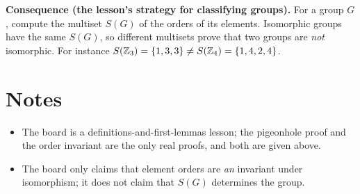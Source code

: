 \documentclass[11pt]{article}
\begin{document}
\textbf{Consequence (the lesson's strategy for classifying groups).} For a group $G$, compute the multiset $S(G)$ of the orders of its elements. Isomorphic groups have the same $S(G)$, so different multisets prove that two groups are \emph{not} isomorphic. For instance $S(\mathbb{Z}_3)=\{1,3,3\}\ne S(\mathbb{Z}_4)=\{1,4,2,4\}$.

\section*{Notes}
\begin{itemize}[nosep]
  \item The board is a definitions-and-first-lemmas lesson; the pigeonhole proof and the order invariant are the only real proofs, and both are given above.
  \item The board only claims that element orders are \emph{an} invariant under isomorphism; it does not claim that $S(G)$ determines the group.
\end{itemize}
\end{document}
